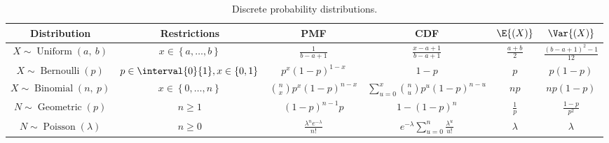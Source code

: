\documentclass{article}
\begin{document}
\begin{table}[H]
    \centering
    \begin{tabular}{c c c c c c}
        \toprule
        \textbf{Distribution}                                     & \textbf{Restrictions}                                  & \textbf{PMF}                                      & \textbf{CDF}                                                     & \(\E{\left( X \right)}\) & \(\Var{\left( X \right)}\)                    \\
        \midrule
        \(X \sim \operatorname{Uniform}{\left( a,\: b \right)}\)  & \(x \in \left\{ a, \dots, b \right\}\)                 & \(\frac{1}{b - a + 1}\)                           & \(\frac{x - a + 1}{b - a + 1}\)                                  & \(\frac{a + b}{2}\)      & \(\frac{\left( b - a + 1 \right)^2 - 1}{12}\) \\
        \(X \sim \operatorname{Bernoulli}{\left( p \right)}\)     & \(p \in \interval{0}{1}, x \in \left\{ 0, 1 \right\}\) & \(p^x \left( 1 - p \right)^{1 - x}\)              & \(1 - p\)                                                        & \(p\)                    & \(p \left( 1 - p \right)\)                    \\
        \(X \sim \operatorname{Binomial}{\left( n,\: p \right)}\) & \(x \in \left\{ 0, \dots, n \right\}\)                 & \(\binom{n}{x} p^x \left( 1 - p \right)^{n - x}\) & \(\sum_{u = 0}^x \binom{n}{u} p^u \left( 1 - p \right)^{n - u}\) & \(np\)                   & \(np\left( 1 - p \right)\)                    \\
        \(N \sim \operatorname{Geometric}{\left( p \right)}\)     & \(n \geq 1\)                                           & \(\left( 1 - p \right)^{n - 1} p\)                & \(1 - \left( 1 - p \right)^n\)                                   & \(\frac{1}{p}\)          & \(\frac{1 - p}{p^2}\)                         \\
        \(N \sim \operatorname{Poisson}{\left( \lambda \right)}\) & \(n \geq 0\)                                           & \(\frac{\lambda^n e^{-\lambda}}{n!}\)             & \(e^{-\lambda} \sum_{u = 0}^n \frac{\lambda^u}{u!}\)             & \(\lambda\)              & \(\lambda\)                                   \\
        \bottomrule
    \end{tabular}
    \caption{Discrete probability distributions.} %
\end{table}
\end{document}
